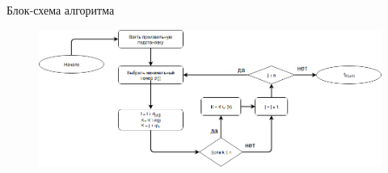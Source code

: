 \documentclass[12pt]{beamer}
\begin{document}
\begin{frame}{Блок-схема алгоритма}
\begin{figure}
\includegraphics[scale=0.34]{algorithm.png}
\end{figure}
\end{frame}
\end{document}
